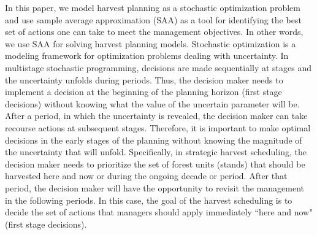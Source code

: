 \documentclass[forests,article,submit,moreauthors,pdftex]{Definitions/mdpi}
\begin{document}
In this paper, we model harvest planning as a stochastic optimization problem and use sample average approximation (SAA) as a tool for identifying the best set of actions one can take to meet the management objectives. In other words, we use SAA for solving harvest planning models. Stochastic optimization is a modeling framework for optimization problems dealing with uncertainty. 
In multistage stochastic programming, decisions are made sequentially at stages and the uncertainty unfolds during periods. Thus, the decision maker needs to implement a decision at the beginning of the planning horizon (first stage decisions) without knowing what the value of the uncertain parameter will be. After a period, in which the uncertainty is revealed, the decision maker can take recourse actions at subsequent stages. 
Therefore, it is important  to make optimal decisions in the early stages of the planning without knowing the magnitude  of the  uncertainty that will unfold. Specifically, in strategic harvest scheduling, the decision maker needs to prioritize the set of forest units (stands) that should be harvested here and now or during the ongoing decade or period. After that period, the decision maker will have the opportunity to revisit the management in the following periods. In this case, the goal of the harvest scheduling is to decide the set of actions that managers should apply immediately ``here and now" (first stage decisions). 
\end{document}

